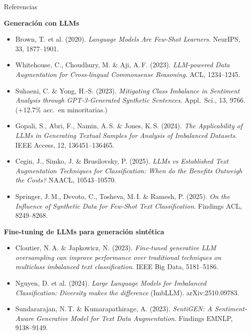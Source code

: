 \begin{frame}[allowframebreaks]{Referencias}
\framebreak

\textbf{Generación con LLMs}
\begin{itemize}\setlength\itemsep{0pt}
  \item Brown, T. et al. (2020). \textit{Language Models Are Few-Shot Learners}. NeurIPS, 33, 1877--1901.
  \item Whitehouse, C., Choudhury, M. \& Aji, A.\,F. (2023). \textit{LLM-powered Data Augmentation for Cross-lingual Commonsense Reasoning}. ACL, 1234--1245.
  \item Suhaeni, C. \& Yong, H.-S. (2023). \textit{Mitigating Class Imbalance in Sentiment Analysis through GPT-3-Generated Synthetic Sentences}. Appl.\ Sci., 13, 9766. ($+12.7\%$ acc.\ en minoritarias.)
  \item Gopali, S., Abri, F., Namin, A.\,S. \& Jones, K.\,S. (2024). \textit{The Applicability of LLMs in Generating Textual Samples for Analysis of Imbalanced Datasets}. IEEE Access, 12, 136451--136465.
  \item Cegin, J., Simko, J. \& Brusilovsky, P. (2025). \textit{LLMs vs Established Text Augmentation Techniques for Classification: When do the Benefits Outweigh the Costs?} NAACL, 10543--10570.
  \item Springer, J.\,M., Devoto, C., Tosheva, M.\,I. \& Ramesh, P. (2025). \textit{On the Influence of Synthetic Data for Few-Shot Text Classification}. Findings ACL, 8249--8268.
\end{itemize}

\textbf{Fine-tuning de LLMs para generación sintética}
\begin{itemize}\setlength\itemsep{0pt}
  \item Cloutier, N.\,A. \& Japkowicz, N. (2023). \textit{Fine-tuned generative LLM oversampling can improve performance over traditional techniques on multiclass imbalanced text classification}. IEEE Big Data, 5181--5186.
  \item Nguyen, D. et al. (2024). \textit{Large Language Models for Imbalanced Classification: Diversity makes the difference} (ImbLLM). arXiv:2510.09783.
  \item Sundararajan, N.\,T. \& Kumarapathirage, A. (2023). \textit{SentiGEN: A Sentiment-Aware Generative Model for Text Data Augmentation}. Findings EMNLP, 9138--9149.
\end{itemize}

\framebreak


\end{frame}
